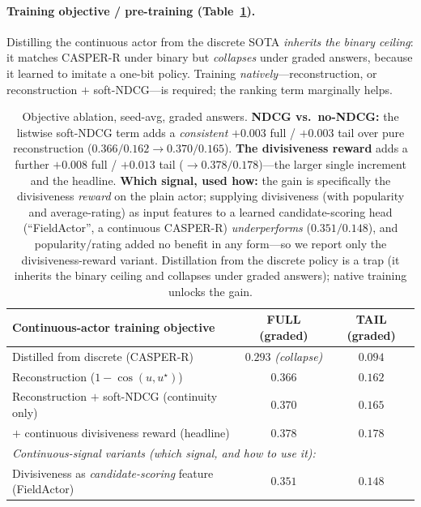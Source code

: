 \documentclass[11pt]{article}
\newcommand{\ustar}{u^{\star}}
\begin{document}
\paragraph{Training objective / pre-training (Table~\ref{tab:obj}).} Distilling the continuous actor from the discrete
SOTA \emph{inherits the binary ceiling}: it matches CASPER-R under binary but \emph{collapses} under graded answers,
because it learned to imitate a one-bit policy. Training \emph{natively}---reconstruction, or reconstruction $+$
soft-NDCG---is required; the ranking term marginally helps.
\begin{table}[h]\centering
\begin{tabular}{lcc}
\toprule
Continuous-actor training objective & FULL (graded) & TAIL (graded) \\
\midrule
Distilled from discrete (CASPER-R) & $0.293$ \emph{(collapse)} & $0.094$ \\
Reconstruction ($1-\cos(u,\ustar)$) & $0.366$ & $0.162$ \\
Reconstruction $+$ soft-NDCG (continuity only) & $0.370$ & $0.165$ \\
\;\;$+$ continuous divisiveness reward (headline) & $\mathbf{0.378}$ & $\mathbf{0.178}$ \\
\midrule
\multicolumn{3}{l}{\emph{Continuous-signal variants (which signal, and how to use it):}}\\
Divisiveness as \emph{candidate-scoring} feature (FieldActor) & $0.351$ & $0.148$ \\
\bottomrule
\end{tabular}
\caption{Objective ablation, seed-avg, graded answers. \textbf{NDCG vs.\ no-NDCG:} the listwise soft-NDCG term adds a
\emph{consistent} $+0.003$ full / $+0.003$ tail over pure reconstruction ($0.366/0.162\!\to\!0.370/0.165$). \textbf{The
divisiveness reward} adds a further $+0.008$ full / $+0.013$ tail ($\to0.378/0.178$)---the larger single increment and the
headline. \textbf{Which signal, used how:} the gain is specifically the divisiveness \emph{reward} on the plain actor;
supplying divisiveness (with popularity and average-rating) as input features to a learned candidate-scoring head
(``FieldActor'', a continuous CASPER-R) \emph{underperforms} ($0.351/0.148$), and popularity/rating added no benefit in
any form---so we report only the divisiveness-reward variant. Distillation from the discrete policy is a trap (it
inherits the binary ceiling and collapses under graded answers); native training unlocks the gain.}\label{tab:obj}
\end{table}
\end{document}
